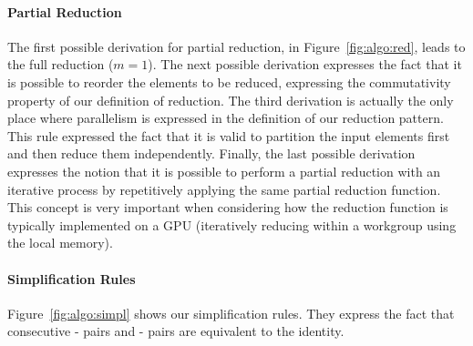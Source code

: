 \paragraph{Partial Reduction}
The first possible derivation for partial reduction, in Figure~\ref{fig:algo:red}, leads to the full reduction ($m=1$).
The next possible derivation expresses the fact that it is possible to reorder the elements to be reduced, expressing the commutativity property of our definition of reduction.
The third derivation is actually the only place where parallelism is expressed in the definition of our reduction pattern.
This rule expressed the fact that it is valid to partition the input elements first and then reduce them independently.
Finally, the last possible derivation expresses the notion that it is possible to perform a partial reduction with an iterative process by repetitively applying the same partial reduction function.
This concept is very important when considering how the reduction function is typically implemented on a GPU (iteratively reducing within a workgroup using the local memory).


\paragraph{Simplification Rules}
Figure~\ref{fig:algo:simpl} shows our simplification rules.
They express the fact that consecutive - pairs and - pairs are equivalent to the identity. %

